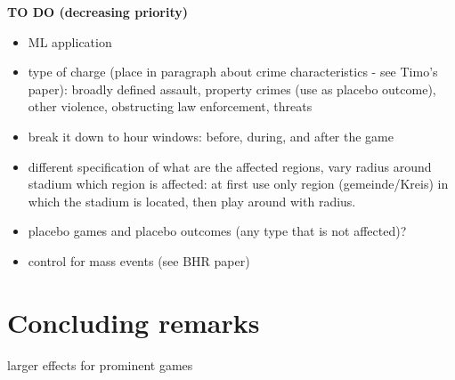\documentclass[11pt, a4paper]{article} %
\begin{document}
\bigskip
{\color{red}\textbf{TO DO (decreasing priority)}}
\begin{itemize}
	\item ML application
	\item type of charge (place in paragraph about crime characteristics - see Timo's paper): broadly defined assault, property crimes (use as placebo outcome), other violence, obstructing law enforcement, threats
	\item break it down to hour windows: before, during, and after the game
	\item different specification of what are the affected regions, vary radius around stadium which region is affected: at first use only region (gemeinde/Kreis) in which the stadium is located, then play around with radius.
	\item placebo games and placebo outcomes (any type that is not affected)?
	\item control for mass events (see BHR paper)
\end{itemize}

































\bigskip
\section{Concluding remarks}\label{sec_soc_ext:conclusion}


larger effects for prominent games

\newpage



\end{document}
